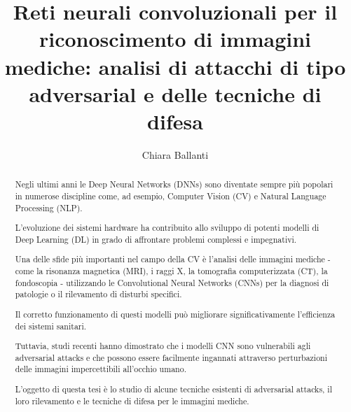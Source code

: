 \documentclass[Lau, oneside, noexaminfo]{sapthesis}
\title{Reti neurali convoluzionali per il riconoscimento di immagini mediche: analisi di attacchi di tipo adversarial e delle tecniche di difesa}
\author{Chiara Ballanti}
\begin{document}
\frontmatter
\maketitle

    \begin{abstract}
    Negli ultimi anni le Deep Neural Networks (DNNs) sono diventate sempre più popolari in numerose discipline come, ad esempio, Computer Vision (CV) e Natural Language Processing (NLP).
    
    L'evoluzione dei sistemi hardware ha contribuito allo sviluppo di potenti modelli di Deep Learning (DL) in grado di affrontare problemi complessi e impegnativi.
    
    Una delle sfide più importanti nel campo della CV è l'analisi delle immagini mediche - come la risonanza magnetica (MRI), i raggi X, la tomografia computerizzata (CT), la fondoscopia - utilizzando le Convolutional Neural Networks (CNNs) per la diagnosi di patologie o il rilevamento di disturbi specifici.
    
    Il corretto funzionamento di questi modelli può migliorare significativamente l'efficienza dei sistemi sanitari.
    
    Tuttavia, studi recenti hanno dimostrato che i modelli CNN sono vulnerabili agli adversarial attacks e che possono essere facilmente ingannati attraverso perturbazioni delle immagini impercettibili all'occhio umano.
    
    L'oggetto di questa tesi è lo studio di alcune tecniche esistenti di adversarial attacks, il loro rilevamento e le tecniche di difesa per le immagini mediche.
    \end{abstract}

\tableofcontents

\mainmatter













\backmatter
{}



\end{document}
